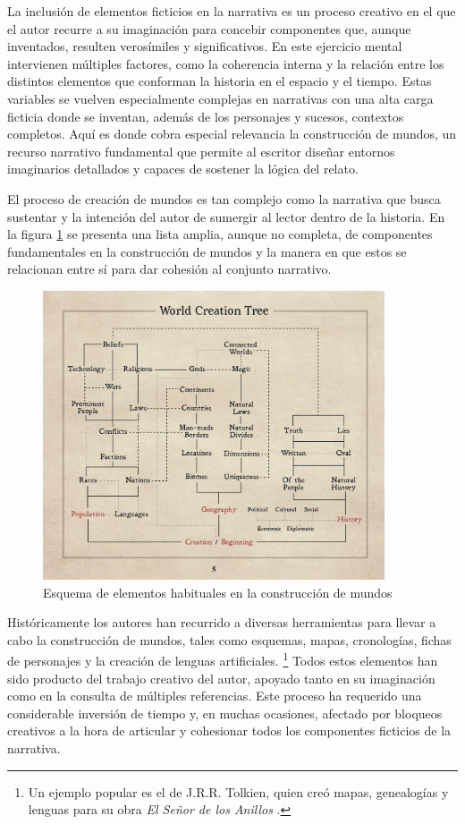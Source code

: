 La inclusión de elementos ficticios en la narrativa es un proceso creativo
en el que el autor recurre a su imaginación para concebir componentes que, aunque inventados,
resulten verosímiles y significativos.
En este ejercicio mental intervienen múltiples factores, como la coherencia interna y la relación 
entre los distintos elementos que conforman la historia en el espacio y el tiempo.
Estas variables se vuelven especialmente complejas en narrativas con una alta carga ficticia
donde se inventan, además de los personajes y sucesos, contextos completos.
Aquí es donde cobra especial relevancia la construcción de mundos\cite{world_building}, un recurso narrativo fundamental que permite
al escritor diseñar entornos imaginarios detallados y capaces de sostener la lógica del relato.

El proceso de creación de mundos es tan complejo como la narrativa que busca sustentar y
la intención del autor de sumergir al lector dentro de la historia.
En la figura \ref{fig:worldBuildingElements} se presenta una lista amplia, aunque no completa,
de componentes fundamentales en la construcción de mundos 
y la manera en que estos se relacionan entre sí para dar cohesión al conjunto narrativo.

\begin{figure}[htbp]
	\centering
	\includegraphics[width=0.9\textwidth]{./Figures/world-building-elements.png}
	\caption{Esquema de elementos habituales en la construcción de mundos}
	\label{fig:worldBuildingElements}
\end{figure}

Históricamente los autores han recurrido a diversas herramientas para llevar a cabo la construcción de mundos,
tales como esquemas, mapas, cronologías, fichas de personajes y la creación de lenguas artificiales.
\footnote{Un ejemplo popular es el de J.R.R. Tolkien, quien creó mapas, genealogías y lenguas para su obra
\textit{El Señor de los Anillos} \cite{tolkien_letters}.}
Todos estos elementos han sido producto del trabajo creativo del autor, apoyado tanto en su imaginación como en la
consulta de múltiples referencias.
Este proceso ha requerido una considerable inversión de tiempo y, en muchas ocasiones,
afectado por bloqueos creativos a la hora de articular y cohesionar todos los componentes ficticios de la narrativa.

